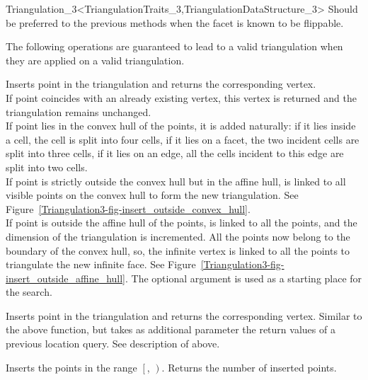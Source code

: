 \begin{ccRefClass}{Triangulation_3<TriangulationTraits_3,TriangulationDataStructure_3>}
\ccGlue
{}
{Should be preferred to the previous methods when the facet is
known to be flippable.
}


The following operations are guaranteed to lead to a valid triangulation 
when they are applied on a valid triangulation.

{Inserts point  in the triangulation and returns the corresponding
 vertex.\\
If point  coincides with an already existing vertex, this 
vertex is returned and the triangulation remains unchanged.\\
If point  lies in the convex hull of the points, it is added
naturally: if it lies inside a cell, the cell is split into four
cells, if it lies on a facet, the two incident cells are split into
three cells, if it lies on an edge, all the cells incident to this
edge are split into two cells.\\
If point  is strictly outside the convex hull but in the affine
hull,  is linked to all visible points on the convex hull to
form the new triangulation. See
Figure~\ref{Triangulation3-fig-insert_outside_convex_hull}.\\  
If point  is outside the affine hull of the points,  is
linked to all the points, and the dimension of the triangulation is
incremented. All the points now belong to the boundary of the convex
hull, so, the infinite vertex is linked to all the points to
triangulate the new infinite face. See 
Figure~\ref{Triangulation3-fig-insert_outside_affine_hull}.
The optional argument  is used as a starting place for the search.}

{Inserts point  in the triangulation and returns the corresponding
 vertex. Similar to the above  function, but takes as additional
 parameter the return values of a previous location query.  See description of
  above.}

{Inserts the points in the range $\left[\right.$,
$\left.\right)$.  Returns the number of inserted points.
}


\end{ccRefClass}
